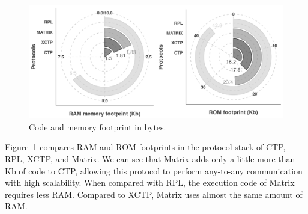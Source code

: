 \begin{figure}[!th]
    \centering
    \includegraphics[width=1\linewidth]{Images/new-ram-rom-usage}
    \caption{Code and memory footprint in bytes.}
    \label{fig:footprint}
\end{figure}

Figure~\ref{fig:footprint} compares RAM and ROM footprints in the protocol stack of CTP, RPL, XCTP, and Matrix. We can see that Matrix adds only a little more than \unit[7]{Kb} of code to CTP, allowing this protocol to perform any-to-any communication with high scalability. When compared with RPL, the execution code of Matrix requires less RAM. Compared to XCTP, Matrix uses almost the same amount of RAM.

